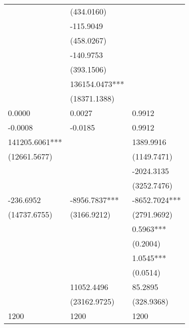 \begin{tabular}{lll}
 & (434.0160) &  \\
 & -115.9049 &  \\
 & (458.0267) &  \\
 & -140.9753 &  \\
 & (393.1506) &  \\
 & 136154.0473*** &  \\
 & (18371.1388) &  \\
0.0000 & 0.0027 & 0.9912 \\
-0.0008 & -0.0185 & 0.9912 \\
141205.6061*** &  & 1389.9916 \\
(12661.5677) &  & (1149.7471) \\
 &  & -2024.3135 \\
 &  & (3252.7476) \\
-236.6952 & -8956.7837*** & -8652.7024*** \\
(14737.6755) & (3166.9212) & (2791.9692) \\
 &  & 0.5963*** \\
 &  & (0.2004) \\
 &  & 1.0545*** \\
 &  & (0.0514) \\
 & 11052.4496 & 85.2895 \\
 & (23162.9725) & (328.9368) \\
1200 & 1200 & 1200 \\
\bottomrule
\end{tabular}
